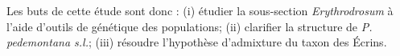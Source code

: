 Les buts de cette étude sont donc : (i) étudier la sous-section \textit{Erythrodrosum} à l'aide d'outils de génétique des populations; (ii) clarifier la structure de \textit{P. pedemontana s.l.}; (iii) résoudre l'hypothèse d'admixture du taxon des Écrins.




